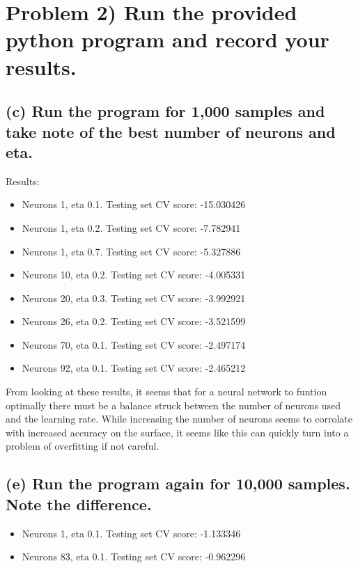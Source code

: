 \documentclass[11pt]{article}
\begin{document}
\section*{Problem 2) Run the provided python program and record your results.}

\subsection*{(c) Run the program for 1,000 samples and take note of the best number of neurons and eta.}
Results:

\begin{itemize}
\item Neurons 1, eta 0.1. Testing set CV score: -15.030426
\item Neurons 1, eta 0.2. Testing set CV score: -7.782941
\item Neurons 1, eta 0.7. Testing set CV score: -5.327886
\item Neurons 10, eta 0.2. Testing set CV score: -4.005331
\item Neurons 20, eta 0.3. Testing set CV score: -3.992921
\item Neurons 26, eta 0.2. Testing set CV score: -3.521599
\item Neurons 70, eta 0.1. Testing set CV score: -2.497174
\item Neurons 92, eta 0.1. Testing set CV score: -2.465212
\end{itemize}

From looking at these results, it seems that for a neural network to funtion optimally there must be a balance struck between the number of neurons used and the learning rate. While increasing the number of neurons seems to corrolate with increased accuracy on the surface, it seems like this can quickly turn into a problem of overfitting if not careful. 

\subsection*{(e) Run the program again for 10,000 samples. Note the difference.}

\begin{itemize}
\item Neurons 1, eta 0.1. Testing set CV score: -1.133346
\item Neurons 83, eta 0.1. Testing set CV score: -0.962296
\end{itemize}
\end{document}
